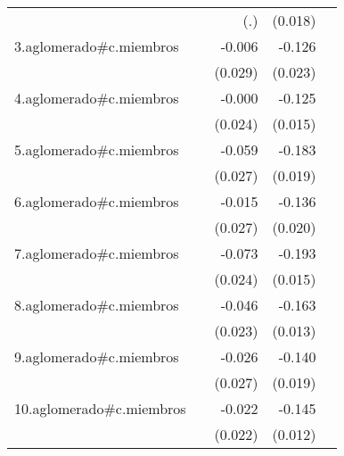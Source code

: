 {\begin{longtable}{l*{4}{D{.}{.}{-1}}}
            &                     &         (.)         &     (0.018)         &                     \\
\addlinespace
3.aglomerado#c.miembros&                     &      -0.006         &      -0.126\sym{***}&                     \\
            &                     &     (0.029)         &     (0.023)         &                     \\
\addlinespace
4.aglomerado#c.miembros&                     &      -0.000         &      -0.125\sym{***}&                     \\
            &                     &     (0.024)         &     (0.015)         &                     \\
\addlinespace
5.aglomerado#c.miembros&                     &      -0.059\sym{*}  &      -0.183\sym{***}&                     \\
            &                     &     (0.027)         &     (0.019)         &                     \\
\addlinespace
6.aglomerado#c.miembros&                     &      -0.015         &      -0.136\sym{***}&                     \\
            &                     &     (0.027)         &     (0.020)         &                     \\
\addlinespace
7.aglomerado#c.miembros&                     &      -0.073\sym{**} &      -0.193\sym{***}&                     \\
            &                     &     (0.024)         &     (0.015)         &                     \\
\addlinespace
8.aglomerado#c.miembros&                     &      -0.046\sym{*}  &      -0.163\sym{***}&                     \\
            &                     &     (0.023)         &     (0.013)         &                     \\
\addlinespace
9.aglomerado#c.miembros&                     &      -0.026         &      -0.140\sym{***}&                     \\
            &                     &     (0.027)         &     (0.019)         &                     \\
\addlinespace
10.aglomerado#c.miembros&                     &      -0.022         &      -0.145\sym{***}&                     \\
            &                     &     (0.022)         &     (0.012)         &                     \\

\end{longtable}}
